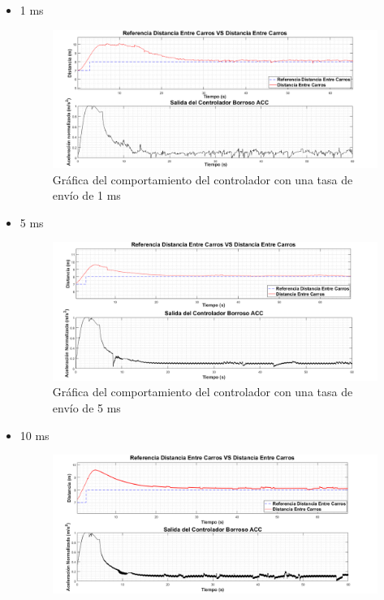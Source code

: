 \begin{itemize}
\item 1 ms
\begin{figure}[H]
	\centering
		\includegraphics[scale=0.49]{Imagenes/1cv}
		\caption{Gráfica del comportamiento del controlador con una tasa de envío de 1 ms}
		\label{fig:sv1}
\end{figure}
\item 5 ms\\
\begin{figure}[H]
	\centering
		\includegraphics[scale=0.49]{Imagenes/5cv}
		\caption{Gráfica del comportamiento del controlador con una tasa de envío de 5 ms}
		\label{fig:sv5}
\end{figure}	
\item 10 ms
\begin{figure}[H]
	\centering
		\includegraphics[scale=0.495]{Imagenes/10sv}

\end{figure}
\end{itemize}
